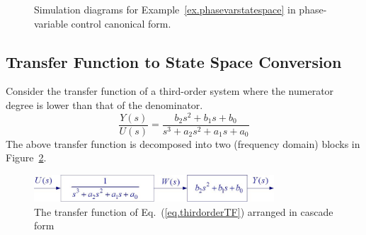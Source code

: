 \begin{figure}[bht]
\centering
{}
\newlength{\subfigoffsetB}
\setlength{\subfigoffsetB}{.5\ht\tempbig}
\addtolength{\subfigoffsetB}{-.5\ht\tempsmall}
\hfill
{}
\caption{\footnotesize
        Simulation diagrams for Example~\ref{ex.phasevarstatespace} in phase-variable control canonical form.
        \label{fig.statespace.phasevardiagram}
        }
\end{figure}

\subsection{Transfer Function to State Space Conversion}

Consider the transfer function of a third-order system where the numerator degree is lower than that of the denominator.
\begin{equation}
    \frac{Y(s)}{U(s)} = \frac{b_2 s^2 + b_1 s + b_0}{
        s^3 + a_2 s^2 + a_1 s + a_0}
    \label{eq.thirdorderTF}
\end{equation}
The above transfer function is decomposed into two (frequency domain) blocks in Figure~\ref{fig.statespace.TFblockdecomp}.

\begin{figure}[bht]
\centering
\includegraphics[width=0.8\textwidth]{TFblockdecomp}
\caption{\footnotesize
        The transfer function of Eq.\ (\ref{eq.thirdorderTF}) arranged in cascade form
        \label{fig.statespace.TFblockdecomp}
        }
\end{figure}

